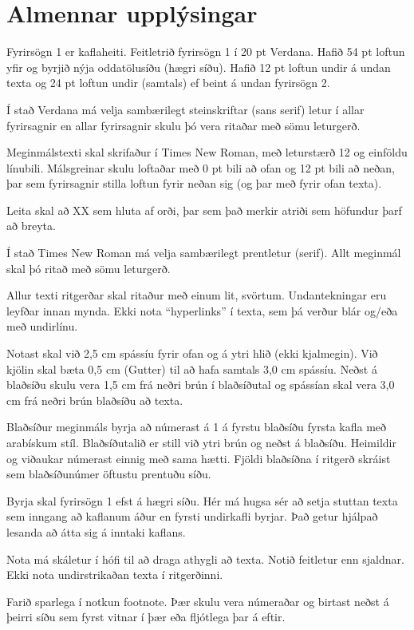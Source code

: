 \documentclass[a4paper, 12pt, twoside]{scrreprt}
\begin{document}
\section{Almennar upplýsingar}
Fyrirsögn 1 er kaflaheiti. Feitletrið fyrirsögn 1 í 20 pt Verdana. Hafið 54 pt loftun yfir og byrjið nýja oddatölusíðu (hægri síðu). Hafið 12 pt loftun undir á undan texta og 24 pt loftun undir (samtals) ef beint á undan fyrirsögn 2.

Í stað Verdana má velja sambærilegt steinskriftar (sans serif) letur í allar fyrirsagnir en allar fyrirsagnir skulu þó vera ritaðar með sömu leturgerð.

Meginmálstexti skal skrifaður í Times New Roman, með leturstærð 12 og einföldu línubili. Málsgreinar skulu loftaðar með 0 pt bili að ofan og 12 pt bili að neðan, þar sem fyrirsagnir stilla loftun fyrir neðan sig (og þar með fyrir ofan texta).

Leita skal að XX sem hluta af orði, þar sem það merkir atriði sem höfundur þarf að breyta.

Í stað Times New Roman má velja sambærilegt prentletur (serif). Allt meginmál skal þó ritað með sömu leturgerð. 

Allur texti ritgerðar skal ritaður með einum lit, svörtum. Undantekningar eru leyfðar innan mynda. Ekki nota “hyperlinks” í texta, sem þá verður blár og/eða með undirlínu.

Notast skal við 2,5 cm spássíu fyrir ofan og á ytri hlið (ekki kjalmegin). Við kjölin skal bæta 0,5 cm (Gutter) til að hafa samtals 3,0 cm spássíu. Neðst á blaðsíðu skulu vera 1,5 cm frá neðri brún í blaðsíðutal og spássían skal vera 3,0 cm frá neðri brún blaðsíðu að texta.

Blaðsíður meginmáls byrja að númerast á 1 á fyrstu blaðsíðu fyrsta kafla með arabískum stíl. Blaðsíðutalið er still við ytri brún og neðst á blaðsíðu. Heimildir og viðaukar númerast einnig með sama hætti. Fjöldi blaðsíðna í ritgerð skráist sem blaðsíðunúmer öftustu prentuðu síðu.

Byrja skal fyrirsögn 1 efst á hægri síðu. Hér má hugsa sér að setja stuttan texta sem inngang að kaflanum áður en fyrsti undirkafli byrjar. Það getur hjálpað lesanda að átta sig á inntaki kaflans.

Nota má skáletur í hófi til að draga athygli að texta. Notið feitletur enn sjaldnar. Ekki nota undirstrikaðan texta í ritgerðinni.

Farið sparlega í notkun footnote. Þær skulu vera númeraðar og birtast neðst á þeirri síðu sem fyrst vitnar í þær eða fljótlega þar á eftir.
\end{document}
